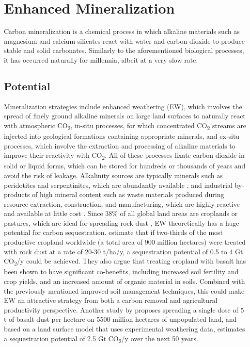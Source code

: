 \section{Enhanced Mineralization}
Carbon mineralization is a chemical process in which alkaline materials such as magnesium and calcium silicates react with water and carbon dioxide to produce stable and solid carbonates. Similarly to the aforementioned biological processes, it has occurred naturally for millennia, albeit at a very slow rate.
\subsection*{Potential}
Mineralization strategies include enhanced weathering (EW), which involves the spread of finely ground alkaline minerals on large land surfaces to naturally react with atmospheric CO\textsubscript{2}, in-situ processes, for which concentrated CO\textsubscript{2} streams are injected into geological formations containing appropriate minerals, and ex-situ processes, which involve the extraction and processing of alkaline materials to improve their reactivity with CO\textsubscript{2}. All of these processes fixate carbon dioxide in solid or liquid forms, which can be stored for hundreds or thousands of years and avoid the risk of leakage. Alkalinity sources are typically minerals such as peridotites and serpentinites, which are abundantly available \parencite{Lackner1997ProgressSubstrates}, and industrial by-products of high mineral content such as waste materials produced during resource extraction, construction, and manufacturing, which are highly reactive and available at little cost \parencite[51]{NRC2015ClimateSequestration}.
Since 38\% of all global land areas are croplands or pastures, which are ideal for spreading rock dust \parencite{Almaraz2022MethodsSettings}, EW theoretically has a huge potential for carbon sequestration. \textcite{Beerling2018FarmingSecurity} estimate that if two-thirds of the most productive cropland worldwide (a total area of 900 million hectares) were treated with rock dust at a rate of 20-30 t/ha/y, a sequestration potential of 0.5 to 4 Gt CO\textsubscript{2}/y could be achieved. They also argue that treating cropland with basalt has been shown to have significant co-benefits, including increased soil fertility and crop yields, and an increased amount of organic material in soils. Combined with the previously mentioned improved soil management techniques, this could make EW an attractive strategy from both a carbon removal and agricultural productivity perspective. Another study by \textcite{Goll2021PotentialRock} proposes spreading a single dose of 5 t of basalt dust per hectare on 5500 million hectares of unpopulated land, and based on a land surface model that uses experimental weathering data, estimates a sequestration potential of 2.5 Gt CO\textsubscript{2}/y over the next 50 years.\\
